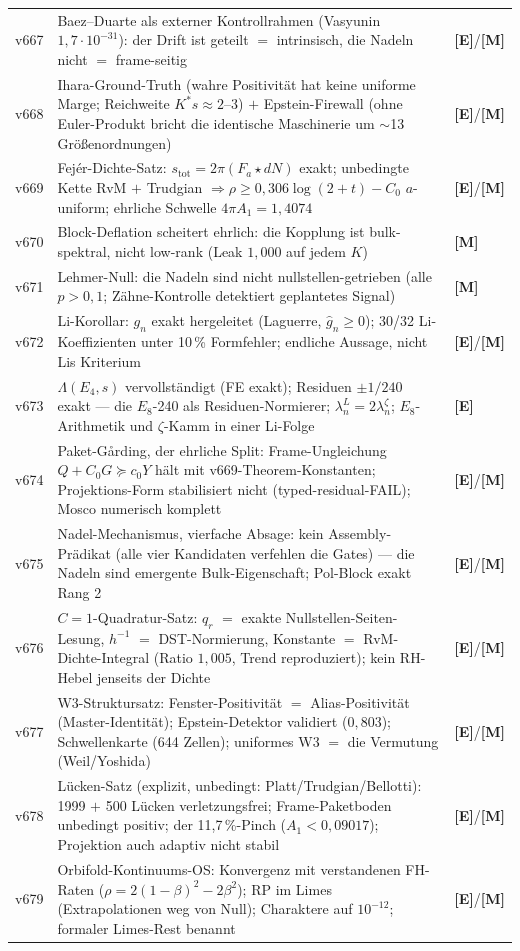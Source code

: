 \documentclass[11pt,a4paper]{article}
\newcommand{\E}{\textcolor{gut}{\textbf{[E]}}}
\newcommand{\M}{\textcolor{mess}{\textbf{[M]}}}
\begin{document}
\begin{longtable}{@{}l p{11.1cm} l@{}}
v667 & Baez--Duarte als externer Kontrollrahmen (Vasyunin $1{,}7 \cdot 10^{-31}$): der Drift ist geteilt $=$ intrinsisch, die Nadeln nicht $=$ frame-seitig & \E/\M \\
v668 & Ihara-Ground-Truth (wahre Positivität hat keine uniforme Marge; Reichweite $K^* s \approx 2$--$3$) $+$ Epstein-Firewall (ohne Euler-Produkt bricht die identische Maschinerie um $\sim$13 Größenordnungen) & \E/\M \\
\midrule
v669 & Fejér-Dichte-Satz: $s_{\mathrm{tot}} = 2\pi(F_a \star dN)$ exakt; unbedingte Kette RvM $+$ Trudgian $\Rightarrow \rho \ge 0{,}306\log(2+t) - C_0$ $a$-uniform; ehrliche Schwelle $4\pi A_1 = 1{,}4074$ & \E/\M \\
v670 & Block-Deflation scheitert ehrlich: die Kopplung ist bulk-spektral, nicht low-rank (Leak $1{,}000$ auf jedem $K$) & \M \\
v671 & Lehmer-Null: die Nadeln sind nicht nullstellen-getrieben (alle $p > 0{,}1$; Zähne-Kontrolle detektiert geplantetes Signal) & \M \\
v672 & Li-Korollar: $g_n$ exakt hergeleitet (Laguerre, $\hat g_n \ge 0$); 30/32 Li-Koeffizienten unter 10\,\% Formfehler; endliche Aussage, nicht Lis Kriterium & \E/\M \\
v673 & $\Lambda(E_4, s)$ vervollständigt (FE exakt); Residuen $\pm 1/240$ exakt --- die $E_8$-240 als Residuen-Normierer; $\lambda_n^L = 2\lambda_n^\zeta$; $E_8$-Arithmetik und $\zeta$-Kamm in einer Li-Folge & \E \\
\midrule
v674 & Paket-Gårding, der ehrliche Split: Frame-Ungleichung $Q + C_0 G \succeq c_0 Y$ hält mit v669-Theorem-Konstanten; Projektions-Form stabilisiert nicht (typed-residual-FAIL); Mosco numerisch komplett & \E/\M \\
v675 & Nadel-Mechanismus, vierfache Absage: kein Assembly-Prädikat (alle vier Kandidaten verfehlen die Gates) --- die Nadeln sind emergente Bulk-Eigenschaft; Pol-Block exakt Rang 2 & \E/\M \\
v676 & $C = 1$-Quadratur-Satz: $q_r$ $=$ exakte Nullstellen-Seiten-Lesung, $h^{-1}$ $=$ DST-Normierung, Konstante $=$ RvM-Dichte-Integral (Ratio $1{,}005$, Trend reproduziert); kein RH-Hebel jenseits der Dichte & \E/\M \\
v677 & W3-Struktursatz: Fenster-Positivität $=$ Alias-Positivität (Master-Identität); Epstein-Detektor validiert ($0{,}803$); Schwellenkarte (644 Zellen); uniformes W3 $=$ die Vermutung (Weil/Yoshida) & \E/\M \\
\midrule
v678 & Lücken-Satz (explizit, unbedingt: Platt/Trudgian/Bellotti): 1999 $+$ 500 Lücken verletzungsfrei; Frame-Paketboden unbedingt positiv; der 11{,}7\,\%-Pinch ($A_1 < 0{,}09017$); Projektion auch adaptiv nicht stabil & \E/\M \\
v679 & Orbifold-Kontinuums-OS: Konvergenz mit verstandenen FH-Raten ($\rho = 2(1-\beta)^2 - 2\beta^2$); RP im Limes (Extrapolationen weg von Null); Charaktere auf $10^{-12}$; formaler Limes-Rest benannt & \E/\M \\
\end{longtable}
\endgroup
\end{document}
